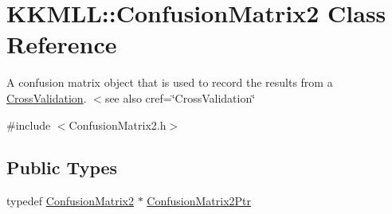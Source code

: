 \hypertarget{class_k_k_m_l_l_1_1_confusion_matrix2}{}\section{K\+K\+M\+LL\+:\+:Confusion\+Matrix2 Class Reference}
\label{class_k_k_m_l_l_1_1_confusion_matrix2}


A confusion matrix object that is used to record the results from a \hyperlink{class_k_k_m_l_l_1_1_cross_validation}{Cross\+Validation}. $<$see also cref=\char`\"{}\+Cross\+Validation\char`\"{}  




{\ttfamily \#include $<$Confusion\+Matrix2.\+h$>$}

\subsection*{Public Types}
\begin{DoxyCompactItemize}
\item 
typedef \hyperlink{class_k_k_m_l_l_1_1_confusion_matrix2}{Confusion\+Matrix2} $\ast$ \hyperlink{class_k_k_m_l_l_1_1_confusion_matrix2_a5e15dd38f24b2b85399c2e43d649bb9a}{Confusion\+Matrix2\+Ptr}
\end{DoxyCompactItemize}
